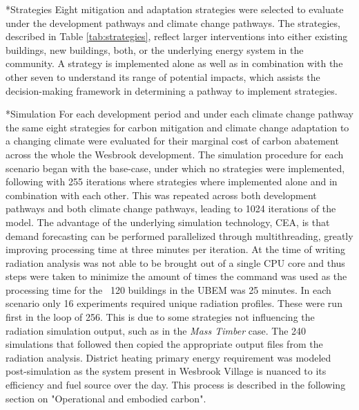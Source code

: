 \documentclass[twocolumn, a4paper,10pt]{article}
\makeatletter
\renewcommand\subsection{\@startsection{subsection}{1}{\z@}{\z@}{\z@}{\normalfont\normalsize\bfseries}}
\renewcommand\subsection{\@startsection{subsection}{1}{\z@}{\z@}{0.1pt}{\normalfont\normalsize\bfseries}}
\makeatother
\begin{document}
\subsection*{Strategies}
Eight mitigation and adaptation strategies were selected to evaluate under the development pathways and climate change pathways. The strategies, described in Table \ref{tab:strategies}, reflect larger interventions into either existing buildings, new buildings, both, or the underlying energy system in the community. A strategy is implemented alone as well as in combination with the other seven to understand its range of potential impacts, which assists the decision-making framework in determining a pathway to implement strategies.

\subsection*{Simulation}
For each development period and under each climate change pathway the same eight strategies for carbon mitigation and climate change adaptation to a changing climate were evaluated for their marginal cost of carbon abatement across the whole the Wesbrook development. The simulation procedure for each scenario began with the base-case, under which no strategies were implemented, following with 255 iterations where strategies where implemented alone and in combination with each other. This was repeated across both development pathways and both climate change pathways, leading to 1024 iterations of the model. The advantage of the underlying simulation technology, CEA, is that demand forecasting can be performed parallelized through multithreading, greatly improving processing time at three minutes per iteration. At the time of writing radiation analysis was not able to be brought out of a single CPU core and thus steps were taken to minimize the amount of times the command was used as the processing time for the ~120 buildings in the UBEM was 25 minutes. In each scenario only 16 experiments required unique radiation profiles. These were run first in the loop of 256. This is due to some strategies not influencing the radiation simulation output, such as in the \textit{Mass Timber} case. The 240 simulations that followed then copied the appropriate output files from the radiation analysis. District heating primary energy requirement was modeled post-simulation as the system present in Wesbrook Village is nuanced to its efficiency and fuel source over the day. This process is described in the following section on "Operational and embodied carbon". 
\end{document}
